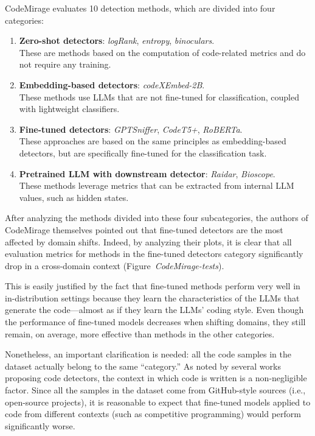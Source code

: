 CodeMirage evaluates 10 detection methods, which are divided into four categories:
\begin{enumerate}
    \item \textbf{Zero-shot detectors}: \textit{logRank}, \textit{entropy}, \textit{binoculars}.\\
    These are methods based on the computation of code-related metrics and do not require any training.
    
    \item \textbf{Embedding-based detectors}: \textit{codeXEmbed-2B}.\\
    These methods use LLMs that are not fine-tuned for classification, coupled with lightweight classifiers.
    
    \item \textbf{Fine-tuned detectors}: \textit{GPTSniffer}, \textit{CodeT5+}, \textit{RoBERTa}.\\
    These approaches are based on the same principles as embedding-based detectors, but are specifically fine-tuned for the classification task.
    
    \item \textbf{Pretrained LLM with downstream detector}: \textit{Raidar}, \textit{Bioscope}.\\
    These methods leverage metrics that can be extracted from internal LLM values, such as hidden states.
\end{enumerate}

After analyzing the methods divided into these four subcategories, 
the authors of CodeMirage themselves pointed out that fine-tuned 
detectors are the most affected by domain shifts. Indeed, by analyzing 
their plots, it is clear that all evaluation metrics for methods in the 
fine-tuned detectors category significantly drop in a cross-domain context 
(Figure~\textit{CodeMirage-tests}). 

This is easily justified by the fact that fine-tuned methods perform 
very well in in-distribution settings because they learn the 
characteristics of the LLMs that generate the code—almost as if 
they learn the LLMs' coding style. Even though the performance of 
fine-tuned models decreases when shifting domains, they still remain, 
on average, more effective than methods in the other categories.

Nonetheless, an important clarification is needed: all the code samples 
in the dataset actually belong to the same “category.” As noted by several 
works proposing code detectors, the context in which code is written is a 
non-negligible factor. Since all the samples in the dataset come from 
GitHub-style sources (i.e., open-source projects), it is reasonable to 
expect that fine-tuned models applied to code from different contexts 
(such as competitive programming) would perform significantly worse.

